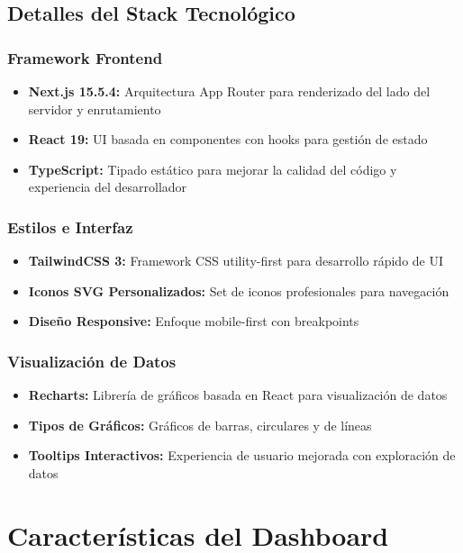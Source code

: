 \documentclass[12pt,a4paper]{article}
\begin{document}
\subsection{Detalles del Stack Tecnológico}

\subsubsection{Framework Frontend}
\begin{itemize}
    \item \textbf{Next.js 15.5.4:} Arquitectura App Router para renderizado del lado del servidor y enrutamiento
    \item \textbf{React 19:} UI basada en componentes con hooks para gestión de estado
    \item \textbf{TypeScript:} Tipado estático para mejorar la calidad del código y experiencia del desarrollador
\end{itemize}

\subsubsection{Estilos e Interfaz}
\begin{itemize}
    \item \textbf{TailwindCSS 3:} Framework CSS utility-first para desarrollo rápido de UI
    \item \textbf{Iconos SVG Personalizados:} Set de iconos profesionales para navegación
    \item \textbf{Diseño Responsive:} Enfoque mobile-first con breakpoints
\end{itemize}

\subsubsection{Visualización de Datos}
\begin{itemize}
    \item \textbf{Recharts:} Librería de gráficos basada en React para visualización de datos
    \item \textbf{Tipos de Gráficos:} Gráficos de barras, circulares y de líneas
    \item \textbf{Tooltips Interactivos:} Experiencia de usuario mejorada con exploración de datos
\end{itemize}

\section{Características del Dashboard}
\end{document}
